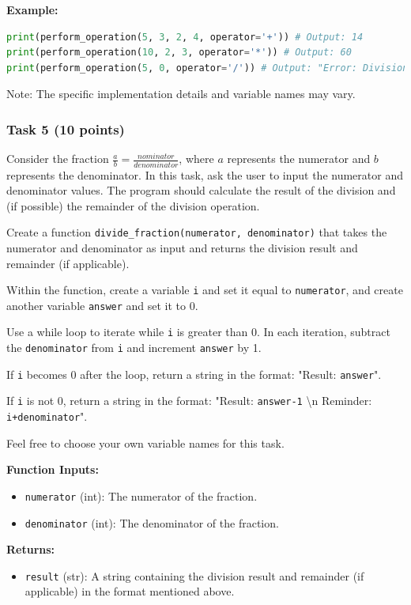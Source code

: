 \documentclass[12pt]{book}
\begin{document}
\textbf{Example:}
\begin{lstlisting}[language=Python]
print(perform_operation(5, 3, 2, 4, operator='+')) # Output: 14
print(perform_operation(10, 2, 3, operator='*')) # Output: 60
print(perform_operation(5, 0, operator='/')) # Output: "Error: Division by zero"
\end{lstlisting}

Note: The specific implementation details and variable names may vary.

\subsubsection{Task 5 (10 points)}
Consider the fraction $\frac{a}{b} = \frac{nominator}{denominator}$, where $a$ represents the numerator and $b$ represents the denominator. In this task, ask the user to input the numerator and denominator values. The program should calculate the result of the division and (if possible) the remainder of the division operation.

Create a function \texttt{divide\_fraction(numerator, denominator)} that takes the numerator and denominator as input and returns the division result and remainder (if applicable).

Within the function, create a variable \texttt{i} and set it equal to \texttt{numerator}, and create another variable \texttt{answer} and set it to 0.

Use a while loop to iterate while \texttt{i} is greater than 0. In each iteration, subtract the \texttt{denominator} from \texttt{i} and increment \texttt{answer} by 1.

If \texttt{i} becomes 0 after the loop, return a string in the format: "Result: \texttt{answer}".

If \texttt{i} is not 0, return a string in the format: "Result: \texttt{answer-1} \textbackslash n Reminder: \texttt{i+denominator}".

Feel free to choose your own variable names for this task.

\textbf{Function Inputs:}
\begin{itemize}
\item \texttt{numerator} (int): The numerator of the fraction.
\item \texttt{denominator} (int): The denominator of the fraction.
\end{itemize}

\textbf{Returns:}
\begin{itemize}
\item \texttt{result} (str): A string containing the division result and remainder (if applicable) in the format mentioned above.
\end{itemize}
\end{document}
